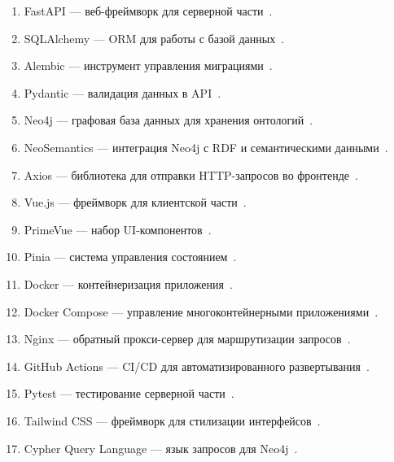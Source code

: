 \documentclass[a4paper,12pt,reqno]{article}
\begin{document}
    \begin{enumerate}
        \item FastAPI — веб-фреймворк для серверной части~\cite{Framework:FastAPI}.
        \item SQLAlchemy — ORM для работы с базой данных~\cite{Library:SQLAlchemy}.
        \item Alembic — инструмент управления миграциями~\cite{Library:Alembic}.
        \item Pydantic — валидация данных в API~\cite{Library:Pydantic}.
        \item Neo4j — графовая база данных для хранения онтологий~\cite{DB:Neo4j}.
        \item NeoSemantics — интеграция Neo4j с RDF и семантическими данными~\cite{Library:NeoSemantics}.
        \item Axios — библиотека для отправки HTTP-запросов во фронтенде~\cite{Library:Axios}.
        \item Vue.js — фреймворк для клиентской части~\cite{Framework:VueJS}.
        \item PrimeVue — набор UI-компонентов~\cite{Framework:PrimeVue}.
        \item Pinia — система управления состоянием~\cite{Library:Pinia}.
        \item Docker — контейнеризация приложения~\cite{Tool:Docker}.
        \item Docker Compose — управление многоконтейнерными приложениями~\cite{Tool:DockerCompose}.
        \item Nginx — обратный прокси-сервер для маршрутизации запросов~\cite{Tool:Nginx}.
        \item GitHub Actions — CI/CD для автоматизированного развертывания~\cite{Tool:GitHubActions}.
        \item Pytest — тестирование серверной части~\cite{Library:Pytest}.
        \item Tailwind CSS — фреймворк для стилизации интерфейсов~\cite{Library:TailwindCSS}.
        \item Cypher Query Language — язык запросов для Neo4j~\cite{QueryLang:CypherQL}.
    \end{enumerate}
    \newpage
    \printbibliography[title=Список источников, heading=bibintoc]

    \newpage
    \listRegistration
\end{document}
